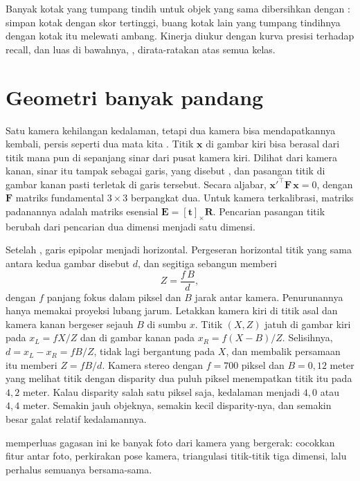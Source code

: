 Banyak kotak yang tumpang tindih untuk objek yang sama dibersihkan dengan : simpan kotak dengan skor tertinggi, buang kotak lain yang tumpang tindihnya dengan
kotak itu melewati ambang. Kinerja diukur dengan kurva presisi terhadap recall, dan luas di
bawahnya, , dirata-ratakan atas semua kelas.

\section{Geometri banyak pandang}

Satu kamera kehilangan kedalaman, tetapi dua kamera bisa mendapatkannya kembali, persis seperti
dua mata kita \citep{hartley2004}. Titik $\bm x$ di gambar kiri bisa berasal dari titik mana pun
di sepanjang sinar dari pusat kamera kiri. Dilihat dari kamera kanan, sinar itu tampak sebagai
garis, yang disebut , dan pasangan titik di gambar kanan pasti terletak di
garis tersebut. Secara aljabar, $\bm x'^\top\bm F\,\bm x=0$, dengan $\bm F$ matriks fundamental
$3\times3$ berpangkat dua. Untuk kamera terkalibrasi, matriks padanannya adalah matriks esensial
$\bm E=[\bm t]_\times\bm R$. Pencarian pasangan titik berubah dari pencarian dua dimensi menjadi
satu dimensi.

Setelah , garis epipolar menjadi horizontal. Pergeseran horizontal titik yang
sama antara kedua gambar disebut  $d$, dan segitiga sebangun memberi
\begin{equation}
Z=\frac{f\,B}{d},
\end{equation}
dengan $f$ panjang fokus dalam piksel dan $B$ jarak antar kamera. Penurunannya hanya memakai
proyeksi lubang jarum. Letakkan kamera kiri di titik asal dan kamera kanan bergeser sejauh $B$ di
sumbu $x$. Titik $(X,Z)$ jatuh di gambar kiri pada $x_L=fX/Z$ dan di gambar kanan pada
$x_R=f(X-B)/Z$. Selisihnya, $d=x_L-x_R=fB/Z$, tidak lagi bergantung pada $X$, dan membalik persamaan itu
memberi $Z=fB/d$. Kamera stereo dengan $f=700$
piksel dan $B=0{,}12$ meter yang melihat titik dengan disparity dua puluh piksel menempatkan titik
itu pada $4{,}2$ meter. Kalau disparity salah satu piksel saja, kedalaman menjadi $4{,}0$ atau
$4{,}4$ meter. Semakin jauh objeknya, semakin kecil disparity-nya, dan semakin besar galat relatif
kedalamannya.

 memperluas gagasan ini ke banyak foto dari kamera yang bergerak:
cocokkan fitur antar foto, perkirakan pose kamera, triangulasi titik-titik tiga dimensi, lalu
perhalus semuanya bersama-sama.

